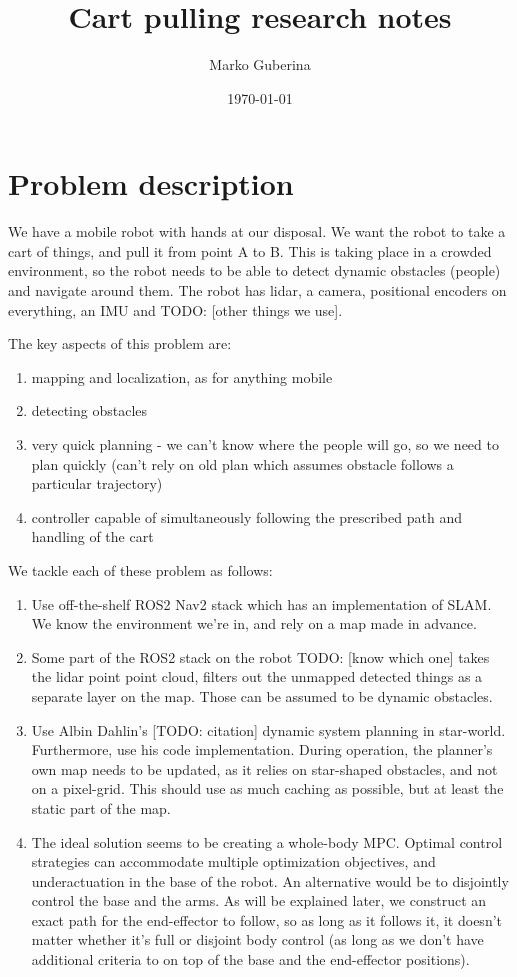 \documentclass{article}
\title{Cart pulling research notes}
\date{\today}
\author{Marko Guberina}
\begin{document}
\maketitle
\tableofcontents
{}

\section{Problem description}
\label{sec-problem-description}
We have a mobile robot with hands at our disposal. 
We want the robot to take a cart of things, and pull it from point A to B.
This is taking place in a crowded environment, so the robot needs to be able
to detect dynamic obstacles (people) and navigate around them.
The robot has lidar, a camera, positional encoders on everything, an IMU
and TODO: [other things we use].

The key aspects of this problem are:
\begin{enumerate}
		\item mapping and localization, as for anything mobile
		\item detecting obstacles
		\item very quick planning - we can't know where the people will go,
				so we need to plan quickly (can't rely on old plan which
				assumes obstacle follows a particular trajectory)
		\item controller capable of simultaneously following the 
				prescribed path and handling of the cart
\end{enumerate} 
We tackle each of these problem as follows:
\begin{enumerate}
\item Use off-the-shelf ROS2 Nav2 stack which has an implementation
	of SLAM. We know the environment we're in, and rely on a map made in 
	advance.
\item Some part of the ROS2 stack on the robot TODO: [know which one]
		takes the lidar point point cloud, filters out the unmapped 
		detected things as a separate layer on the map. Those can be assumed to be dynamic obstacles.
\item Use Albin Dahlin's [TODO: citation] dynamic system planning in star-world.
	Furthermore, use his code implementation. During operation,
	the planner's own map needs to be updated, as it relies on star-shaped
	obstacles, and not on a pixel-grid. This should use 
	as much caching as possible, but at least the static part of the map.
\item The ideal solution seems to be creating a whole-body MPC. 
Optimal control strategies can accommodate 
multiple optimization objectives, and underactuation in the base of the robot.
An alternative would be to disjointly control the base and the arms.
As will be explained later, we construct an exact path for the end-effector
to follow, so as long as it follows it, it doesn't matter whether
it's full or disjoint body control (as long as we don't have additional criteria
to on top of the base and the end-effector positions).
\end{enumerate}
\end{document}

